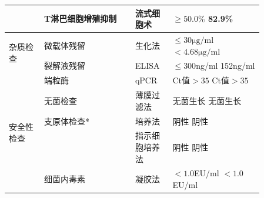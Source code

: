 \documentclass[UTF8,10pt,a4paper,fontset=fandol]{ctexart}
\newcommand{\fieldvalue}[1]{#1}
\begin{document}
\begin{center}
\begin{tabular}{|p{0.12\linewidth}|p{0.31\linewidth}|p{0.12\linewidth}|p{0.31\linewidth}|}
&
\fieldvalue{T淋巴细胞增殖抑制} &
\fieldvalue{流式细胞术} &
\fieldvalue{$\geq50.0\%$}\quad
\fieldvalue{82.9\%}
\\ \hline
\multirow{2}{*}{杂质检查}
&
\fieldvalue{微载体残留} &
\fieldvalue{生化法} &
\fieldvalue{$\leq30\mathrm{\mu g/ml}$}\quad
\fieldvalue{$<4.68\mathrm{\mu g/ml}$}
\\ \cline{2-4}
&
\fieldvalue{裂解液残留} &
\fieldvalue{ELISA} &
\fieldvalue{$\leq300$ng/ml}\quad
\fieldvalue{152ng/ml}
\\ \hline
\multirow{5}{*}{安全性检查}
&
\fieldvalue{端粒酶} &
\fieldvalue{qPCR} &
\fieldvalue{Ct值$>35$}\quad
\fieldvalue{Ct值$>35$}
\\ \cline{2-4}
&
\fieldvalue{无菌检查} &
\fieldvalue{薄膜过滤法} &
\fieldvalue{无菌生长}\quad
\fieldvalue{无菌生长}
\\ \cline{2-4}
&
\fieldvalue{支原体检查*} &
\fieldvalue{培养法} &
\fieldvalue{阴性}\quad
\fieldvalue{阴性}
\\ \cline{3-4}
&
&
\fieldvalue{指示细胞培养法} &
\fieldvalue{阴性}\quad
\fieldvalue{阴性}
\\ \cline{2-4}
&
\fieldvalue{细菌内毒素} &
\fieldvalue{凝胶法} &
\fieldvalue{$<1.0$EU/ml}\quad
\fieldvalue{$<1.0$EU/ml}
\\ \hline
\end{tabular}
\end{center}
\end{document}
